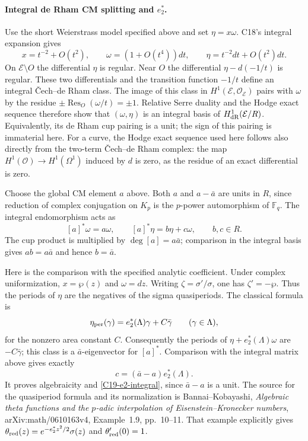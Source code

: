 \paragraph{Integral de Rham CM splitting and $e_2^*$.}
Use the short Weierstrass model specified above and set
$\eta=x\omega$.  C18's integral expansion gives
\[
 x=t^{-2}+O(t^2),\qquad
 \omega=(1+O(t^4))dt,\qquad
 \eta=t^{-2}dt+O(t^2)dt.
\]
On $\mathcal E\setminus O$ the differential $\eta$ is regular.
Near $O$ the differential $\eta-d(-1/t)$ is regular.  These
two differentials and the transition function $-1/t$ define
an integral \v Cech--de Rham class.  The image of this class
in $H^1(\mathcal E,\mathcal O_{\mathcal E})$ pairs with
$\omega$ by the residue $\pm\operatorname{Res}_O(\omega/t)
=\pm1$.  Relative Serre duality and the Hodge exact sequence
therefore show that $(\omega,\eta)$ is an integral basis of
$H^1_{\rm dR}(\mathcal E/R)$.  Equivalently, its de Rham cup
pairing is a unit; the sign of this pairing is immaterial here.
For a curve, the Hodge exact sequence used here follows also
directly from the two-term \v Cech--de Rham complex: the map
$H^1(\mathcal O)\to H^1(\Omega^1)$ induced by $d$ is zero,
as the residue of an exact differential is zero.

Choose the global CM element $a$ above.  Both $a$ and
$a-\bar a$ are units in $R$, since reduction of complex
conjugation on $K_p$ is the $p$-power automorphism of
$\mathbb F_q$.  The integral endomorphism acts as
\[
 [a]^*\omega=a\omega,
 \qquad [a]^*\eta=b\eta+c\omega,
 \qquad b,c\in R.
\]
The cup product is multiplied by $\deg[a]=a\bar a$;
comparison in the integral basis gives $ab=a\bar a$ and
hence $b=\bar a$.

Here is the comparison with the specified analytic coefficient.
Under complex uniformization, $x=\wp(z)$ and $\omega=dz$.
Writing $\zeta=\sigma'/\sigma$, one has
$\zeta'=-\wp$.  Thus the periods of $\eta$ are the negatives
of the sigma quasiperiods.  The classical formula is
\[
 \eta_{\rm per}(\gamma)
    =e_2^*(\Lambda)\gamma+C\bar\gamma
       \qquad(\gamma\in\Lambda),
\]
for the nonzero area constant $C$.
Consequently the periods of
$\eta+e_2^*(\Lambda)\omega$ are $-C\bar\gamma$;
this class is a $\bar a$-eigenvector for $[a]^*$.
Comparison with the integral matrix above gives exactly
\[
 c=(\bar a-a)e_2^*(\Lambda).
\]
It proves algebraicity and \eqref{C19-e2-integral}, since
$\bar a-a$ is a unit.  The source for the quasiperiod formula
and its normalization is Bannai--Kobayashi,
\emph{Algebraic theta functions and the $p$-adic interpolation
of Eisenstein--Kronecker numbers}, arXiv:math/0610163v4,
Example~1.9, pp.~10--11.  That example explicitly gives
$\theta_{\rm red}(z)=e^{-e_2^*z^2/2}\sigma(z)$ and
$\theta_{\rm red}'(0)=1$.

